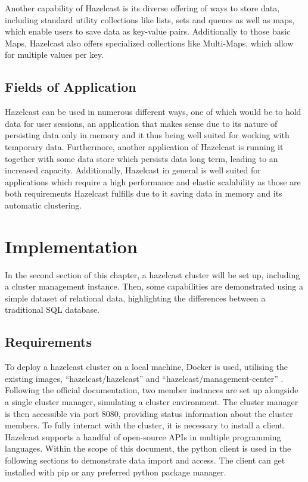 Another capability of Hazelcast is its diverse offering of ways to store data, including standard utility collections like lists, sets and queues as well as maps, which enable users to save data as key-value pairs. Additionally to those basic Maps, Hazelcast also offers  
specialized collections like Multi-Maps, which allow for multiple values per key. \cite{Johns.2015}
\subsection{Fields of Application} \label{subsec:fieldsOfApplicationHazelcast}

Hazelcast can be used in numerous different ways, one of which would be to hold data for user sessions, an application that makes sense due to its nature 
of persisting data only in memory and it thus being well suited for working with temporary data. Furthermore, another application of Hazelcast is 
running it together with some data store which persists data long term, leading to an increased capacity. Additionally, Hazelcast in general is well 
suited for applications which require a high performance and elastic scalability as those are both requirements Hazelcast fulfills due to it saving data in memory and 
its automatic clustering. \cite{Johns.2015} \newline


\section{Implementation} \label{sec:implementationHazelcast}

In the second section of this chapter, a hazelcast cluster will be set up, including a cluster management 
instance. Then, some capabilities are demonstrated using a simple dataset of relational data, highlighting 
the differences between a traditional SQL database.

\subsection{Requirements} \label{subsec:requirementsHazelcast}

To deploy a hazelcast cluster on a local machine, Docker is used, utilising the existing images, 
\enquote{hazelcast/hazelcast} \textcite{Hazelcast.Docker.Hazelcast} and \enquote{hazelcast/management-center} 
\textcite{Hazelcast.Docker.ManagementCenter}. 
Following the official documentation, two member instances are set up alongside a single cluster manager, 
simulating a cluster environment. The cluster manager is then accessible via port 8080, providing status 
information about the cluster members. To fully interact with the cluster, it is necessary to install a 
client. Hazelcast supports a handful of open-source APIs in multiple programming languages. 
\textcite{Hazelcast.Clients} Within the scope of this document, the python client is 
used in the following sections to demonstrate data import and access. The client can get installed with pip 
or any preferred python package manager.


